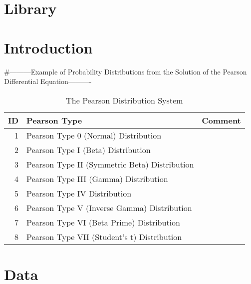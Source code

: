 \section{Library}


\section{Introduction}

#---------Example of Probability Distributions from the Solution of the Pearson Differential Equation----------
\begin{table}
\caption{The Pearson Distribution System \cite{key103}}
\begin{tabular}{r|p{4cm}|l}
ID & Pearson Type & Comment \\
\hline
 1 & Pearson Type 0 (Normal) Distribution & \\
 2 & Pearson Type I (Beta) Distribution & \\
 3 & Pearson Type II (Symmetric Beta) Distribution & \\
 4 & Pearson Type III (Gamma) Distribution & \\
 5 & Pearson Type IV Distribution & \\
 6 & Pearson Type V (Inverse Gamma) Distribution & \\
 7 & Pearson Type VI (Beta Prime) Distribution & \\
 8 & Pearson Type VII (Student's t) Distribution & \\
\hline
\end{tabular}
\end{table}

\section{Data}

